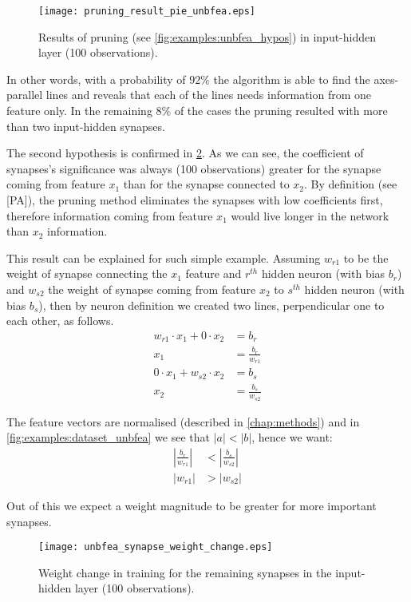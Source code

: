 \begin{figure}[H]
\centering
\texttt{[image: pruning\_result\_pie\_unbfea.eps]}
\caption{Results of pruning (see \cref{fig:examples:unbfea_hypos}) in input-hidden layer (100 observations).}
\label{fig:examples:pruning_result_pie_unbfea}
\end{figure}

In other words, with a probability of $ 92\% $ the algorithm is able to find the axes-parallel lines and reveals that each of the lines needs information from one feature only. In the remaining $ 8\% $ of the cases the pruning resulted with more than two input-hidden synapses.

The second hypothesis is confirmed in \cref{fig:examples:unbfea_synapse_weight_change}. As we can see, the coefficient of synapses's significance was always (100 observations) greater for the synapse coming from feature $ x_1 $ than for the synapse connected to $ x_2 $. By definition (see [PA]), the pruning method eliminates the synapses with low coefficients first, therefore information coming from feature $ x_1 $ would live longer in the network than $ x_2 $ information.

This result can be explained for such simple example. Assuming $ w_{r1} $ to be the weight of synapse connecting the $ x_1 $ feature and $ r^{th} $ hidden neuron (with bias $ b_r$) and $ w_{s2} $ the weight of synapse coming from feature $ x_2 $ to $ s^{th} $ hidden neuron (with bias $ b_s $), then by neuron definition \citep{article:perceptron} we created two lines, perpendicular one to each other, as follows.
\begin{align}
w_{r1} \cdot x_1 + 0 \cdot x_2 &= b_r \\
x_1 &= \frac{b_r}{w_{r1}} \\
0 \cdot x_1 + w_{s2} \cdot x_2 &= b_s \\
x_2 &= \frac{b_s}{w_{s2}}
\end{align}

The feature vectors are normalised (described in \cref{chap:methods}) and in \cref{fig:examples:dataset_unbfea} we see that $ |a| < |b| $, hence we want:
\begin{align}
|\frac{b_r}{w_{r1}}| &< |\frac{b_s}{w_{s2}}| \\
|w_{r1}| &> |w_{s2}|
\end{align}

Out of this we expect a weight magnitude to be greater for more important synapses.

\begin{figure}[H]
\centering
\texttt{[image: unbfea\_synapse\_weight\_change.eps]}
\caption{Weight change in training for the remaining synapses in the input-hidden layer (100 observations).}
\label{fig:examples:unbfea_synapse_weight_change}
\end{figure}

